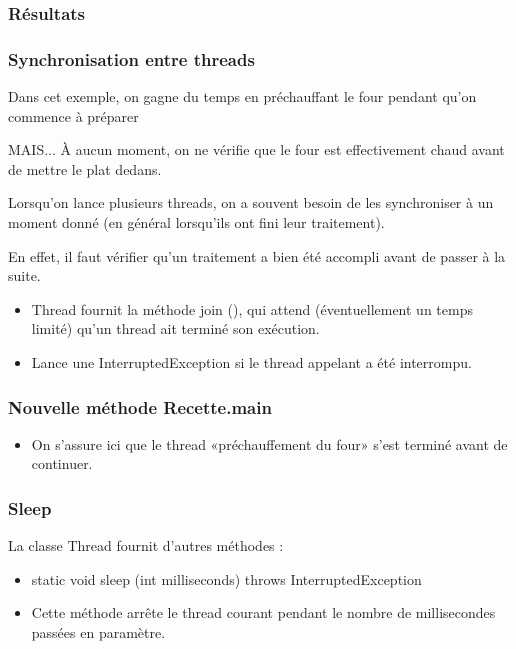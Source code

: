 \documentclass{beamer}
\begin{document}
\begin{frame}
  \frametitle{Résultats}

\end{frame}

\begin{frame}
  \frametitle{Synchronisation entre threads}
  Dans cet exemple, on gagne du temps en préchauffant le four
  pendant qu'on commence à préparer
  \begin{alertblock}{MAIS...}
    À aucun moment, on ne vérifie que le four est effectivement chaud
    avant de mettre le plat dedans.
  \end{alertblock}
  Lorsqu'on lance plusieurs threads, on a souvent besoin de les
  synchroniser à un moment donné (en général lorsqu'ils ont fini leur
  traitement).
  
  En effet, il faut vérifier qu'un traitement a bien été accompli
  avant de passer à la suite.

  \begin{itemize}
  \item Thread fournit la méthode join (), qui attend (éventuellement
    un temps limité) qu'un thread ait terminé son exécution.
  \item Lance une InterruptedException si le thread appelant a été interrompu.
  \end{itemize}
\end{frame}

\begin{frame}
  \frametitle{Nouvelle méthode Recette.main}
  
  \begin{itemize}
  \item On s'assure ici que le thread «préchauffement du four» s'est
    terminé avant de continuer.
  \end{itemize}
\end{frame}

\begin{frame}
  \frametitle{Sleep}
  La classe Thread fournit d'autres méthodes :
  \begin{itemize}
  \item static void sleep (int milliseconds) throws InterruptedException
  \item Cette méthode arrête le thread courant pendant le nombre de
    millisecondes passées en paramètre.
  \end{itemize}
  
\end{frame}
\end{document}
